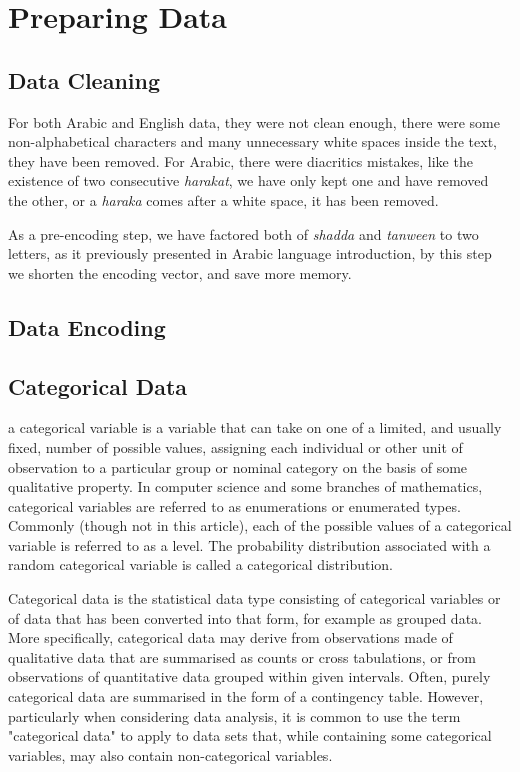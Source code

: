 \documentclass[12pt]{report}
\begin{document}
\section{Preparing Data}


\subsection{Data Cleaning}

For both Arabic and English data, they were not clean enough, there were some
non-alphabetical characters and many unnecessary white spaces inside the text,
they have been removed.  For Arabic, there were diacritics mistakes, like the
existence of two consecutive \textit{harakat}, we have only kept one and have
removed the other, or a \textit{haraka} comes after a white space, it has been
removed. 

As a pre-encoding step, we have factored both of \textit{shadda} and
\textit{tanween} to two letters, as it previously presented in Arabic language
introduction,  by this step we shorten the encoding vector, and save more memory.


\subsection{Data Encoding}

\subsection*{Categorical Data}
a categorical variable is a variable that can take on one of a limited, and
usually fixed, number of possible values, assigning each individual or other unit
of observation to a particular group or nominal category on the basis of some
qualitative property. In computer science and some branches of mathematics,
categorical variables are referred to as enumerations or enumerated types.
Commonly (though not in this article), each of the possible values of a
categorical variable is referred to as a level. The probability distribution
associated with a random categorical variable is called a categorical
distribution.

Categorical data is the statistical data type consisting of categorical variables or of data that has been converted into that form, for example as grouped data. More specifically, categorical data may derive from observations made of qualitative data that are summarised as counts or cross tabulations, or from observations of quantitative data grouped within given intervals. Often, purely categorical data are summarised in the form of a contingency table. However, particularly when considering data analysis, it is common to use the term "categorical data" to apply to data sets that, while containing some categorical variables, may also contain non-categorical variables.
\end{document}
